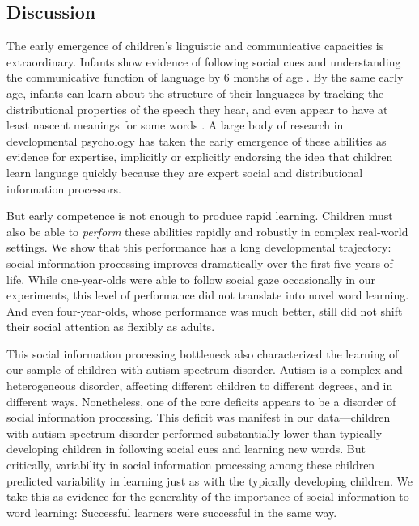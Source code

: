 \documentclass{pnastwo}
\begin{document}
\begin{article}
\section{Discussion}

The early emergence of children's linguistic and communicative capacities is extraordinary. Infants show evidence of following social cues and understanding the communicative function of language by 6 months of age \citep{senju2008, vouloumanos2014}. By the same early age, infants can learn about the structure of their languages by tracking the distributional properties of the speech they hear, and even appear to have at least nascent meanings for some words \citep{thiessen2003, bergelson2012}. A large body of research in developmental psychology has taken the early emergence of these abilities as evidence for expertise, implicitly or explicitly endorsing the idea that children learn language quickly because they are expert social and distributional information processors.

But early competence is not enough to produce rapid learning. Children must also be able to \emph{perform} these abilities rapidly and robustly in complex real-world settings. We show that this performance has a long developmental trajectory: social information processing improves dramatically over the first five years of life. While one-year-olds were able to follow social gaze occasionally in our experiments, this level of performance did not translate into novel word learning. And even four-year-olds, whose performance was much better, still did not shift their social attention as flexibly as adults.

This social information processing bottleneck also characterized the learning of our sample of children with autism spectrum disorder. Autism is a complex and heterogeneous disorder, affecting different children to different degrees, and in different ways. Nonetheless, one of the core deficits appears to be a disorder of social information processing. This deficit was manifest in our data---children with autism spectrum disorder performed substantially lower than typically developing children in following social cues and learning new words. But critically, variability in social information processing among these children predicted variability in learning just as with the typically developing children.  We take this as evidence for the generality of the importance of social information to word learning: Successful learners were successful in the same way.


\end{article}
\end{document}
